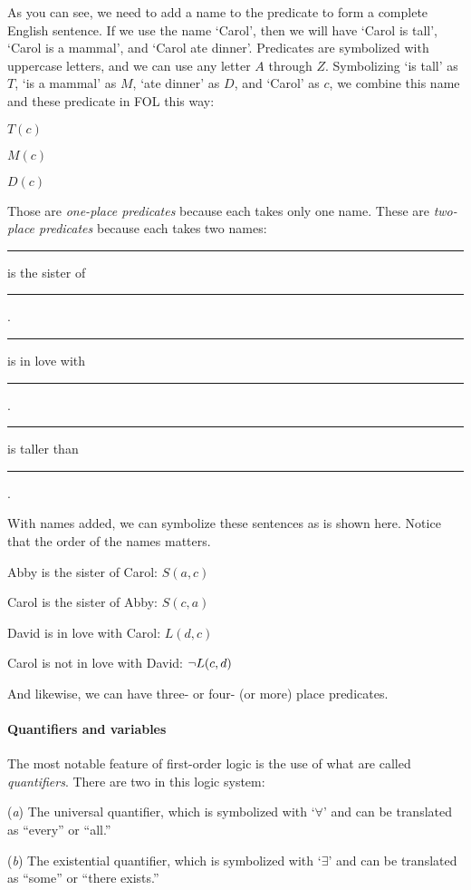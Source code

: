 As you can see, we need to add a name to the predicate to form a complete English sentence. If we use the name `Carol’, then we will have ‘Carol is tall’, ‘Carol is a mammal’, and ‘Carol ate dinner’.
Predicates are symbolized with uppercase letters, and we can use any letter $A$ through $Z$. Symbolizing `is tall' as $T$, `is a mammal' as $M$, `ate dinner' as $D$, and `Carol' as $c$, we combine this name and these predicate in FOL this way:

\begin{ebullet}
	\item[] $T(c)$
	\item[] $M(c)$
	\item[] $D(c)$
\end{ebullet}

Those are \textit{one-place predicates} because each takes only one name. These are \textit{two-place predicates} because each takes two names:

\begin{ebullet}
	\item[] \rule{1cm}{0.15mm} is the sister of \rule{1cm}{0.15mm} .
	\item[] \rule{1cm}{0.15mm} is in love with \rule{1cm}{0.15mm} .
	\item[] \rule{1cm}{0.15mm} is taller than \rule{1cm}{0.15mm} .
\end{ebullet}
With names added, we can symbolize these sentences as is shown here. Notice that the order of the names matters.

\begin{ebullet}
	\item[] Abby is the sister of Carol: $S(a,c)$
	\item[] Carol is the sister of Abby: $S(c,a)$
	\item[] David is in love with Carol: $L(d,c)$
	\item[] Carol is not in love with David: ${\neg} L(c,d)$
\end{ebullet}
And likewise, we can have three- or four- (or more) place predicates. 


\paragraph{Quantifiers and variables}

The most notable feature of first-order logic is the use of what are called \textit{quantifiers}. There are two in this logic system:

\begin{ebullet}
	\item[(\textit{a})] The universal quantifier, which is symbolized with `$\forall$' and can be translated as ``every'' or ``all.''
	\item[(\textit{b})] The existential quantifier, which is symbolized with `$\exists$' and can be translated as ``some'' or ``there exists.''
\end{ebullet}

